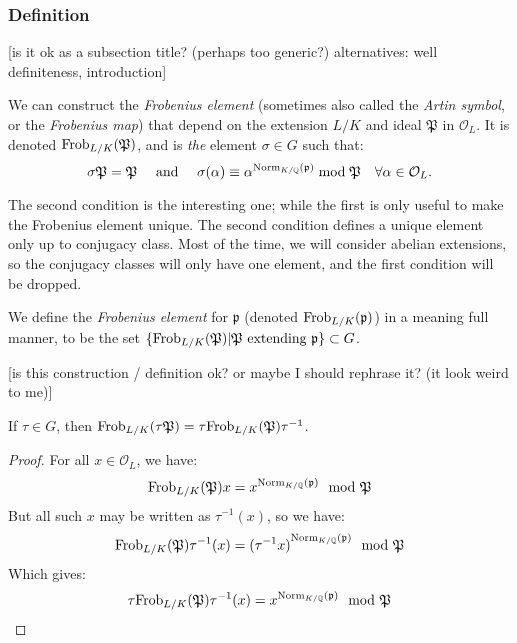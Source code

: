 \subsubsection{Definition}
[is it ok as a subsection title? (perhaps too generic?) alternatives: well definiteness, introduction]

We can construct the \textit{Frobenius element} (sometimes also called the \textit{Artin symbol}, or the \textit{Frobenius map}) that depend on the extension $L/K$ and ideal $\mathfrak{P}$ in $\mathcal{O}_L$.
It is denoted $\Frob{L/K}{\mathfrak{P}}$, and is \textit{the} element $\sigma \in G$ such that:
$$
\sigma \mathfrak{P} = \mathfrak{P}
\quad \text{ and } \quad
\sigma(\alpha) \equiv \alpha^{\Norm[K/\Q]{\mathfrak{p}}} \bmod{\mathfrak{P}} \quad \forall \alpha \in \mathcal{O}_L.
$$

The second condition is the interesting one; while the first is only useful to make the Frobenius element unique.
The second condition defines a unique element only up to conjugacy class.
Most of the time, we will consider abelian extensions, so the conjugacy classes will only have one element, and the first condition will be dropped.

We define the \textit{Frobenius element} for $\mathfrak{p}$ (denoted $\Frob{L/K}{\mathfrak{p}}$) in a meaning full manner, to be the set $\{\Frob{L/K}{\mathfrak{P}} | \mathfrak{P} \text{ extending } \mathfrak{p}\} \subset G$.

[is this construction / definition ok? or maybe I should rephrase it? (it look weird to me)]

\begin{property}
	If $\tau \in G$, then 
	$\Frob{L/K}{\mathfrak{\tau P}} = \tau \Frob{L/K}{\mathfrak{P}} \tau^{-1}$.
\end{property}
\begin{proof}
	For all $x \in \mathcal{O}_L$, we have:
	$$
	\Frob{L/K}{\mathfrak{P}}x 
	= x^{\Norm[K/\Q]{\mathfrak{p}}} \mod \mathfrak{P}
	$$
	But all such $x$ may be written as $\tau^{-1}(x)$, so we have:
	$$
	\Frob{L/K}{\mathfrak{P}} \tau^{-1}(x) 
	= {(\tau^{-1} x)}^{\Norm[K/\Q]{\mathfrak{p}}} \mod \mathfrak{P}
	$$
	Which gives:
	$$
	\tau \Frob{L/K}{\mathfrak{P}}\tau^{-1}(x) 
	= x^{\Norm[K/\Q]{\mathfrak{p}}} \mod \mathfrak{P}
	$$
\end{proof}


